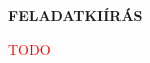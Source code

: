 \clearpage
\thispagestyle{empty} %
\begin{center}
\large
\textbf{FELADATKIÍRÁS}\\
\end{center}

\textcolor{red}{TODO}





